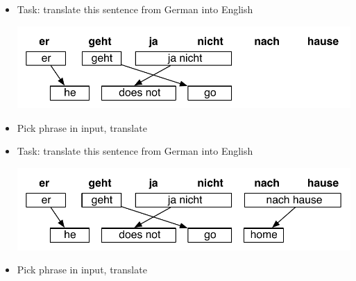 \documentclass[landscape]{slides}
\begin{document}
\begin{itemize}\vspace{10mm}
\item Task: translate this sentence from German into English
\begin{center}
\includegraphics[scale=1.5]{translation-step4.pdf}
\end{center}
\item Pick phrase in input, translate
\end{itemize}


\begin{itemize}\vspace{10mm}
\item Task: translate this sentence from German into English
\begin{center}
\includegraphics[scale=1.5]{translation-step5.pdf}
\end{center}
\item Pick phrase in input, translate
\end{itemize}

\end{document}
